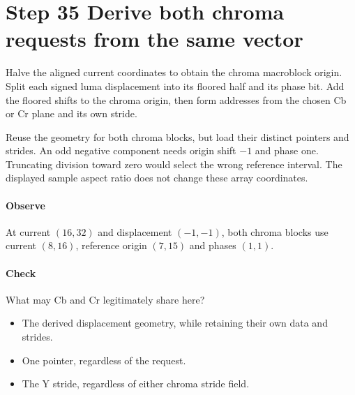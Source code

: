 \section{Step 35 Derive both chroma requests from the same vector}\label{h263-macroblock-s05}
Halve the aligned current coordinates to obtain the chroma macroblock origin.
Split each signed luma displacement into its floored half and its phase bit.
Add the floored shifts to the chroma origin, then form addresses from the chosen
Cb or Cr plane and its own stride.

Reuse the geometry for both chroma blocks, but load their distinct pointers and
strides. An odd negative component needs origin shift $-1$ and phase one.
Truncating division toward zero would select the wrong reference interval.
The displayed sample aspect ratio does not change these array coordinates.

\paragraph{Observe} At current $(16,32)$ and displacement $(-1,-1)$, both chroma
blocks use current $(8,16)$, reference origin $(7,15)$ and phases $(1,1)$.
\paragraph{Check} What may Cb and Cr legitimately share here?
\begin{itemize}
  \item[A.] The derived displacement geometry, while retaining their own data and strides.
  \item[B.] One pointer, regardless of the request.
  \item[C.] The Y stride, regardless of either chroma stride field.
\end{itemize}
